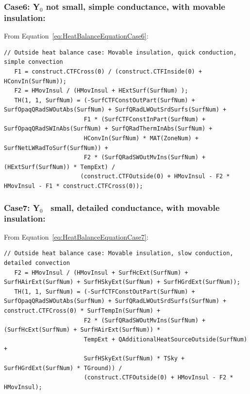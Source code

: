 \subsubsection{Case6: Y\(_{0}\) not small, simple conductance, with movable insulation:}\label{case6-yux5f0-not-small-simple-conductance-with-movable-insulation-1}

From Equation~\ref{eq:HeatBalanceEquationCase6}:

\begin{lstlisting}
// Outside heat balance case: Movable insulation, quick conduction, simple convection
   F1 = construct.CTFCross(0) / (construct.CTFInside(0) + HConvIn(SurfNum));
   F2 = HMovInsul / (HMovInsul + HExtSurf(SurfNum) );
   TH(1, 1, SurfNum) = (-SurfCTFConstOutPart(SurfNum) + SurfOpaqQRadSWOutAbs(SurfNum) + SurfQRadLWOutSrdSurfs(SurfNum) +
                       F1 * (SurfCTFConstInPart(SurfNum) + SurfOpaqQRadSWInAbs(SurfNum) + SurfQRadThermInAbs(SurfNum) +
                       HConvIn(SurfNum) * MAT(ZoneNum) + SurfNetLWRadToSurf(SurfNum)) +
                       F2 * (SurfQRadSWOutMvIns(SurfNum) + (HExtSurf(SurfNum)) * TempExt) /
                      (construct.CTFOutside(0) + HMovInsul - F2 * HMovInsul - F1 * construct.CTFCross(0));
\end{lstlisting}

\subsubsection{Case7: Y\(_{0}\)~ small, detailed conductance, with movable insulation:}\label{case7-yux5f0-small-detailed-conductance-with-movable-insulation-1}

From Equation~\ref{eq:HeatBalanceEquationCase7}:

\begin{lstlisting}
// Outside heat balance case: Movable insulation, slow conduction, detailed convection
   F2 = HMovInsul / (HMovInsul + SurfHcExt(SurfNum) + SurfHAirExt(SurfNum) + SurfHSkyExt(SurfNum) + SurfHGrdExt(SurfNum));
   TH(1, 1, SurfNum) = (-SurfCTFConstOutPart(SurfNum) + SurfOpaqQRadSWOutAbs(SurfNum) + SurfQRadLWOutSrdSurfs(SurfNum) + construct.CTFCross(0) * SurfTempIn(SurfNum) +
                       F2 * (SurfQRadSWOutMvIns(SurfNum) + (SurfHcExt(SurfNum) + SurfHAirExt(SurfNum)) *
                       TempExt + QAdditionalHeatSourceOutside(SurfNum) +
                       SurfHSkyExt(SurfNum) * TSky + SurfHGrdExt(SurfNum) * TGround)) /
                       (construct.CTFOutside(0) + HMovInsul - F2 * HMovInsul);
\end{lstlisting}


